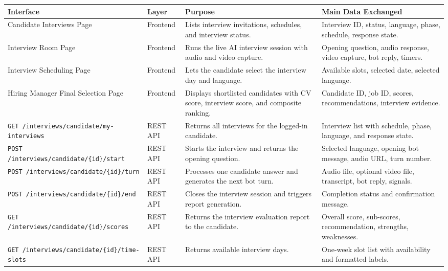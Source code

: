 \begin{spacing}{1.1}
\begin{center}
\label{tab:sprint4_interfaces}
\begin{tabularx}{\textwidth}{|p{4cm}|p{2.3cm}|X|p{3.8cm}|}
\hline
\rowcolor{gray!20}
\textbf{Interface} & \textbf{Layer} & \textbf{Purpose} & \textbf{Main Data Exchanged} \\ \hline

Candidate Interviews Page & Frontend & Lists interview invitations, schedules, and interview status. & Interview ID, status, language, phase, schedule, response state. \\ \hline
Interview Room Page & Frontend & Runs the live AI interview session with audio and video capture. & Opening question, audio response, video capture, bot reply, timers. \\ \hline
Interview Scheduling Page & Frontend & Lets the candidate select the interview day and language. & Available slots, selected date, selected language. \\ \hline
Hiring Manager Final Selection Page & Frontend & Displays shortlisted candidates with CV score, interview score, and composite ranking. & Candidate ID, job ID, scores, recommendations, interview evidence. \\ \hline
\texttt{GET /interviews/candidate/my-interviews} & REST API & Returns all interviews for the logged-in candidate. & Interview list with schedule, phase, language, and response state. \\ \hline
\texttt{POST /interviews/candidate/\{id\}/start} & REST API & Starts the interview and returns the opening question. & Selected language, opening bot message, audio URL, turn number. \\ \hline
\texttt{POST /interviews/candidate/\{id\}/turn} & REST API & Processes one candidate answer and generates the next bot turn. & Audio file, optional video file, transcript, bot reply, signals. \\ \hline
\texttt{POST /interviews/candidate/\{id\}/end} & REST API & Closes the interview session and triggers report generation. & Completion status and confirmation message. \\ \hline
\texttt{GET /interviews/candidate/\{id\}/scores} & REST API & Returns the interview evaluation report to the candidate. & Overall score, sub-scores, recommendation, strengths, weaknesses. \\ \hline
\texttt{GET /interviews/candidate/\{id\}/time-slots} & REST API & Returns available interview days. & One-week slot list with availability and formatted labels. \\ \hline

\end{tabularx}
\end{center}
\end{spacing}
